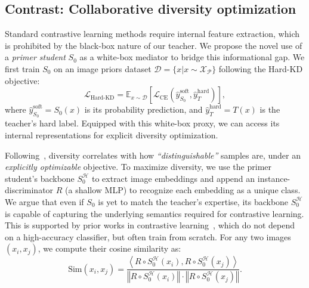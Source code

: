 \subsection{Contrast: Collaborative diversity optimization} \label{sec:03-framework-contrast}
\begin{foldable} %
  Standard contrastive learning methods require internal feature extraction, which is prohibited by the black-box nature of our teacher.
  We propose the novel use of a \textit{primer student} $S_{0}$ as a white-box mediator to bridge this informational gap.
  We first train $S_{0}$ on an image priors dataset $\mathcal{D} = \{x | x \sim \mathcal{X}_\mathcal{P}\}$ following the Hard-KD objective:
  \begin{equation} \label{eq:loss-hard-kd}
    \mathcal{L}_\text{Hard-KD} = \mathbb{E}_{x \sim \mathcal{D}} \left[\mathcal{L}_\text{CE} \left(\hat{y}_{S_0}^\text{soft}, \hat{y}_{T}^\text{hard} \right)\right],
  \end{equation}
  where $\hat{y}_{S_0}^\text{soft} = S_0(x)$ is its probability prediction, and $\hat{y}_{T}^\text{hard} = T(x)$ is the teacher's hard label.
  Equipped with this white-box proxy, we can access its internal representations for explicit diversity optimization.
\end{foldable}

\begin{foldable} %
  Following~\cite{fang2021contrastive}, diversity correlates with how \textit{``distinguishable''} samples are, under an \textit{explicitly optimizable} objective.
  To maximize diversity, we use the primer student's backbone $S_{0}^\mathcal{H}$ to extract image embeddings and append an instance-discriminator $R$ (a shallow MLP) to recognize each embedding as a unique class.
  We argue that even if $S_0$ is yet to match the teacher's expertise, its backbone $S_{0}^\mathcal{H}$ is capable of capturing the underlying semantics required for contrastive learning.
  This is supported by prior works in contrastive learning~\cite{chen2020simple,he2020momentum,zbontar2021barlow}, which do not depend on a high-accuracy classifier, but often train from scratch.
  For any two images $(x_i, x_j)$, we compute their cosine similarity as:
  \begin{equation}
    \text{Sim}\left(x_i, x_j\right)=
    \frac{ \left\langle R \circ S_{0}^\mathcal{H}(x_i), R \circ S_{0}^\mathcal{H}(x_j)\right\rangle }
    { \left\Vert R \circ S_{0}^\mathcal{H}(x_i) \right\Vert \cdot \left\Vert R \circ S_{0}^\mathcal{H}(x_j) \right\Vert }.
  \end{equation}
\end{foldable}

